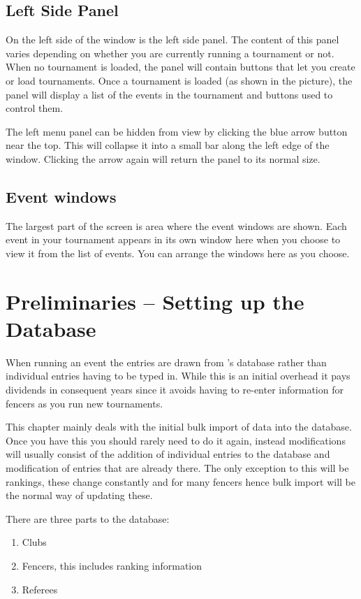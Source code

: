 \documentclass[a4paper,11pt]{memoir}
\begin{document}
\section{Left Side Panel}
On the left side of the window is the left side panel. The content of this panel varies depending on whether you are currently running a tournament or not. When no tournament is loaded, the panel will contain buttons that let you create or load tournaments. Once a tournament is loaded (as shown in the picture), the panel will display a list of the events in the tournament and buttons used to control them.

The left menu panel can be hidden from view by clicking the blue arrow button near the top. This will collapse it into a small bar along the left edge of the window. Clicking the arrow again will return the panel to its normal size.

\section{Event windows}
The largest part of the \fencingtime{} screen is area where the event windows are shown. Each event in your tournament appears in its own window here when you choose to view it from the list of events. You can arrange the windows here as you choose.

\chapter{Preliminaries -- Setting up the Database}
When running an event the entries are drawn from \fencingtime{}'s database rather than individual entries having to be typed in. While this is an initial overhead it pays dividends in consequent years since it avoids having to re-enter information for fencers as you run new tournaments. 

This chapter mainly deals with the initial bulk import of data into the database. Once you have this you should rarely need to do it again, instead modifications will usually consist of the addition of individual entries to the database and modification of entries that are already there. The only exception to this will be rankings, these change constantly and for many fencers hence bulk import will be the normal way of updating these.

There are three parts to the database:

\begin{enumerate}
 \item Clubs
 \item Fencers, this includes ranking information
 \item Referees
\end{enumerate}
\end{document}

